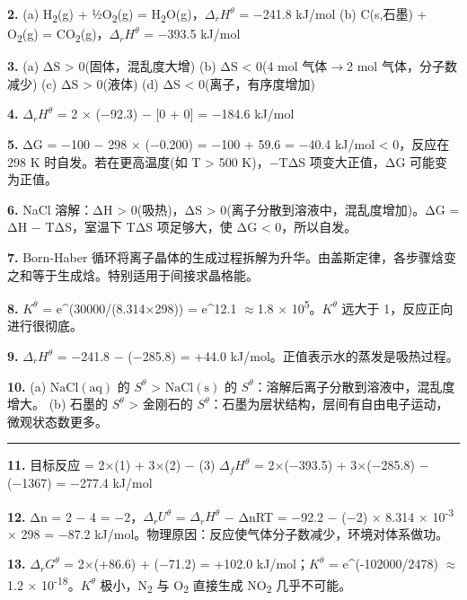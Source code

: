 \documentclass[a4paper,11pt]{ctexart}
\newcommand{\箭}{\ensuremath{\rightarrow}}
\newcommand{\左箭}{\ensuremath{\leftarrow}}
\newcommand{\上箭}{\ensuremath{\uparrow}}
\newcommand{\下箭}{\ensuremath{\downarrow}}
\newcommand{\衡}{\ensuremath{\rightleftharpoons}}
\newcommand{\双箭}{\ensuremath{\leftrightarrow}}
\newcommand{\约等于}{\ensuremath{\approx}}
\newcommand{\小于等于}{\ensuremath{\leq}}
\newcommand{\大于等于}{\ensuremath{\geq}}
\newcommand{\不等于}{\ensuremath{\neq}}
\newcommand{\西格马}{\ensuremath{\sigma}}
\newcommand{\派}{\ensuremath{\pi}}
\begin{document}
\textbf{2.}
(a) H\textsubscript{2}(g) + ½O\textsubscript{2}(g) = H\textsubscript{2}O(g)，\(\Delta_r H^\theta\) = −241.8 kJ/mol
(b) C(s,石墨) + O\textsubscript{2}(g) = CO\textsubscript{2}(g)，\(\Delta_r H^\theta\) = −393.5 kJ/mol

\textbf{3.}
(a) ΔS \textgreater{} 0(固体，混乱度大增)
(b) ΔS \textless{} 0(4 mol 气体\箭2 mol 气体，分子数减少)
(c) ΔS \textgreater{} 0(液体)
(d) ΔS \textless{} 0(离子，有序度增加)

\textbf{4.} \(\Delta_r H^\theta\) = 2 × (−92.3) − {[}0 + 0{]} = −184.6 kJ/mol

\textbf{5.} ΔG = −100 − 298 × (−0.200) = −100 + 59.6 = −40.4 kJ/mol \textless{} 0，反应在 298 K 时自发。若在更高温度(如 T \textgreater{} 500 K)，−TΔS 项变大正值，ΔG 可能变为正值。

\textbf{6.} NaCl 溶解：ΔH \textgreater{} 0(吸热)，ΔS \textgreater{} 0(离子分散到溶液中，混乱度增加)。ΔG = ΔH − TΔS，室温下 TΔS 项足够大，使 ΔG \textless{} 0，所以自发。

\textbf{7.} Born-Haber 循环将离子晶体的生成过程拆解为升华。由盖斯定律，各步骤焓变之和等于生成焓。特别适用于间接求晶格能。

\textbf{8.} \(K^\theta\) = e\^{}(30000/(8.314×298)) = e\^{}12.1 \约等于 1.8 × 10\textsuperscript{5}。\(K^\theta\) 远大于 1，反应正向进行很彻底。

\textbf{9.} \(\Delta_r H^\theta\) = −241.8 − (−285.8) = +44.0 kJ/mol。正值表示水的蒸发是吸热过程。

\textbf{10.}
(a) \(\mathrm{NaCl(aq)}\) 的 \(S^\theta\) \textgreater{} \(\mathrm{NaCl(s)}\) 的 \(S^\theta\)：溶解后离子分散到溶液中，混乱度增大。
(b) 石墨的 \(S^\theta\) \textgreater{} 金刚石的 \(S^\theta\)：石墨为层状结构，层间有自由电子运动，微观状态数更多。

\begin{center}\rule{0.5\linewidth}{0.5pt}\end{center}

\textbf{11.} 目标反应 = 2×(1) + 3×(2) − (3)
\(\Delta_f H^\theta\) = 2×(−393.5) + 3×(−285.8) − (−1367) = −277.4 kJ/mol

\textbf{12.} Δn = 2 − 4 = −2，\(\Delta_r U^\theta\) = \(\Delta_r H^\theta\) − ΔnRT = −92.2 − (−2) × 8.314 × 10\textsuperscript{-3} × 298 = −87.2 kJ/mol。物理原因：反应使气体分子数减少，环境对体系做功。

\textbf{13.} \(\Delta_r G^\theta\) = 2×(+86.6) + (−71.2) = +102.0 kJ/mol；\(K^\theta\) = e\^{}(-102000/2478) \约等于 1.2 × 10\textsuperscript{-18}。\(K^\theta\) 极小，N\textsubscript{2} 与 O\textsubscript{2} 直接生成 NO\textsubscript{2} 几乎不可能。
\end{document}
